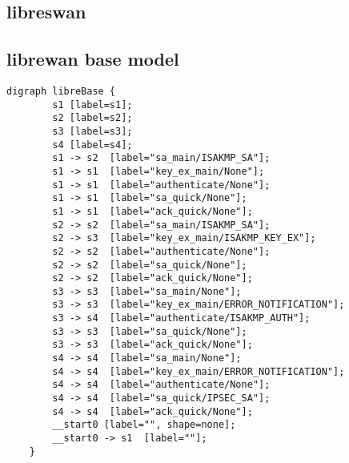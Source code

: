 \begin{appendices}
\section*{libreswan}
\subsection*{librewan base model}

\begin{lstlisting}[numbers=none]
	digraph libreBase {
		s1 [label=s1];
		s2 [label=s2];
		s3 [label=s3];
		s4 [label=s4];
		s1 -> s2  [label="sa_main/ISAKMP_SA"];
		s1 -> s1  [label="key_ex_main/None"];
		s1 -> s1  [label="authenticate/None"];
		s1 -> s1  [label="sa_quick/None"];
		s1 -> s1  [label="ack_quick/None"];
		s2 -> s2  [label="sa_main/ISAKMP_SA"];
		s2 -> s3  [label="key_ex_main/ISAKMP_KEY_EX"];
		s2 -> s2  [label="authenticate/None"];
		s2 -> s2  [label="sa_quick/None"];
		s2 -> s2  [label="ack_quick/None"];
		s3 -> s3  [label="sa_main/None"];
		s3 -> s3  [label="key_ex_main/ERROR_NOTIFICATION"];
		s3 -> s4  [label="authenticate/ISAKMP_AUTH"];
		s3 -> s3  [label="sa_quick/None"];
		s3 -> s3  [label="ack_quick/None"];
		s4 -> s4  [label="sa_main/None"];
		s4 -> s4  [label="key_ex_main/ERROR_NOTIFICATION"];
		s4 -> s4  [label="authenticate/None"];
		s4 -> s4  [label="sa_quick/IPSEC_SA"];
		s4 -> s4  [label="ack_quick/None"];
		__start0 [label="", shape=none];
		__start0 -> s1  [label=""];
	}
\end{lstlisting}
\newpage


\end{appendices}
